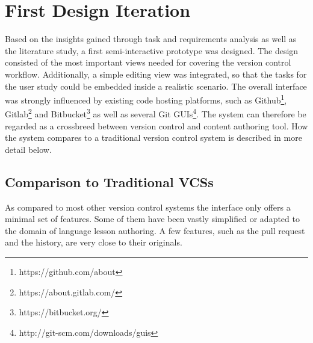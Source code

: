 \chapter{First Design Iteration} \label{chapter:design-first-iteration}
Based on the insights gained through task and requirements analysis as well as the literature study, a first semi-interactive prototype was designed. The design consisted of the most important views needed for covering the version control workflow. Additionally, a simple editing view was integrated, so that the tasks for the user study could be embedded inside a realistic scenario. The overall interface was strongly influenced by existing code hosting platforms, such as Github\footnote{https://github.com/about}, Gitlab\footnote{https://about.gitlab.com/} and Bitbucket\footnote{https://bitbucket.org/} as well as several Git GUIs\footnote{http://git-scm.com/downloads/guis}. The system can therefore be regarded as a crossbreed between version control and content authoring tool. How the system compares to a traditional version control system is described in more detail below.

\section{Comparison to Traditional VCSs} \label{sec:git-feature-comparison}
As compared to most other version control systems the interface only offers a minimal set of features. Some of them have been vastly simplified or adapted to the domain of language lesson authoring. A few features, such as the pull request and the history, are very close to their originals.

